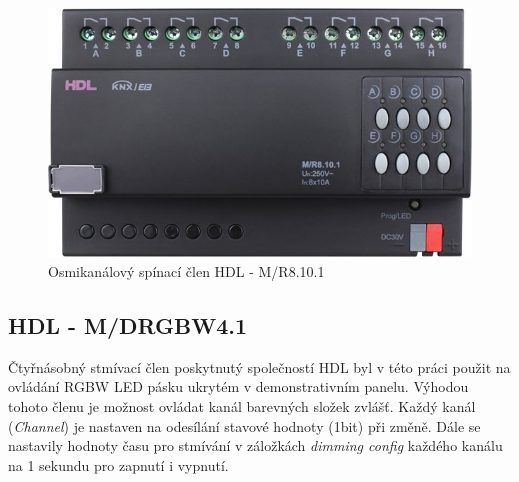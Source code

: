 \begin{figure}[!ht]
  \begin{center}
    \includegraphics[scale=0.35]{obrazky/HLD aktor1.jpg}
  \end{center}
  \caption[Osmikanálový spínací člen HDL - M/R8.10.1 \cite{HDL aktor1}]{Osmikanálový spínací člen HDL - M/R8.10.1  \cite{HDL aktor1}}
  \label{fig:Osmikanálový spínací člen HDL - M/R8.10.1}
\end{figure}

\subsection{HDL - M/DRGBW4.1}
Čtyřnásobný stmívací člen poskytnutý společností HDL byl v této práci použit na ovládání RGBW LED pásku ukrytém v demonstrativním panelu. Výhodou tohoto členu je možnost ovládat kanál barevných složek zvlášť. Každý kanál (\textit{Channel}) je nastaven na odesílání stavové hodnoty (1bit) při změně. Dále se nastavily hodnoty času pro stmívání v záložkách \textit{dimming config} každého kanálu na 1 sekundu pro zapnutí i vypnutí. 


